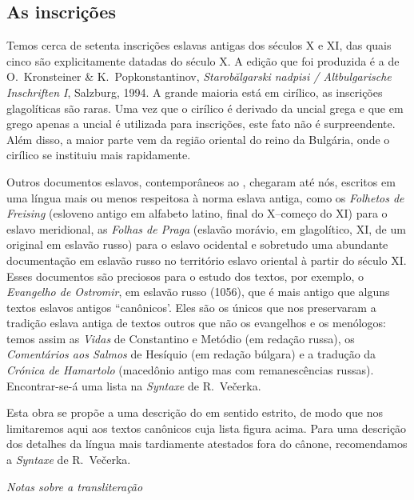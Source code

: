 \subsection{As inscrições}

Temos cerca de setenta inscrições eslavas antigas dos séculos X e XI, das quais
cinco são explicitamente datadas do século X.
A edição que foi produzida é a de O.\ Kronsteiner \& K.\ Popkonstantinov,
\emph{Starobălgarski nadpisi / Altbulgarische Inschriften I}, Salzburg, 1994.
A grande maioria está em cirílico, as inscrições glagolíticas são raras.
Uma vez que o cirílico é derivado da uncial grega e que em grego apenas a
uncial é utilizada para inscrições, este fato não é surpreendente.
Além disso, a maior parte vem da região oriental do reino da Bulgária, onde o
cirílico se instituiu mais rapidamente.

Outros documentos eslavos, contemporâneos ao , chegaram até nós,
escritos em uma língua mais ou menos respeitosa à norma eslava antiga, como os
\emph{Folhetos de Freising} (esloveno antigo em alfabeto latino, final do
X--começo do XI) para o eslavo meridional, as \emph{Folhas de Praga} (eslavão
morávio, em glagolítico, XI, de um original em eslavão russo) para o eslavo
ocidental e sobretudo uma abundante documentação em eslavão russo no território
eslavo oriental à partir do século XI\@.
Esses documentos são preciosos para o estudo dos textos, por exemplo, o
\emph{Evangelho de Ostromir}, em eslavão russo (1056), que é mais antigo que
alguns textos eslavos antigos ``canônicos'.
Eles são os únicos que nos preservaram a tradição eslava antiga de textos outros
que não os evangelhos e os menólogos: temos assim as \emph{Vidas} de Constantino
e Metódio (em redação russa), os \emph{Comentários aos Salmos} de Hesíquio (em
redação búlgara) e a tradução da \emph{Crónica de Hamartolo} (macedônio antigo
mas com remanescências russas). Encontrar-se-á uma lista na \emph{Syntaxe} de
R.\ Večerka.\nocite{Vecerka2003}

Esta obra se propõe a uma descrição do  em sentido estrito, de modo
que nos limitaremos aqui aos textos canônicos cuja lista figura acima.
Para uma descrição dos detalhes da língua mais tardiamente atestados fora do
cânone, recomendamos a \emph{Syntaxe} de R.\ Večerka.\nocite{Vecerka2003}

\bigskip
\noindent \emph{Notas sobre a transliteração}

